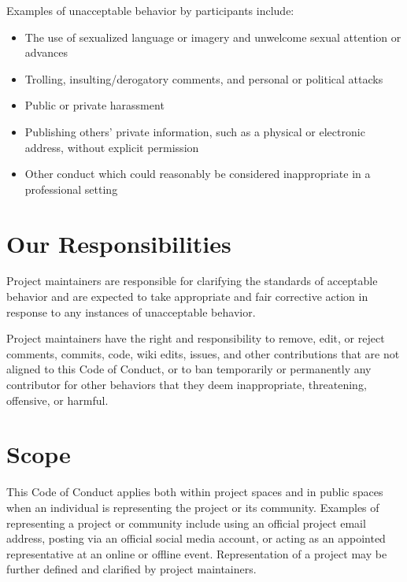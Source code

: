 \documentclass[letterpaper,10pt,english]{sphinxmanual}
\begin{document}
\sphinxAtStartPar
Examples of unacceptable behavior by participants include:
\begin{itemize}
\item {} 
\sphinxAtStartPar
The use of sexualized language or imagery and unwelcome sexual attention or advances

\item {} 
\sphinxAtStartPar
Trolling, insulting/derogatory comments, and personal or political attacks

\item {} 
\sphinxAtStartPar
Public or private harassment

\item {} 
\sphinxAtStartPar
Publishing others’ private information, such as a physical or electronic address, without explicit permission

\item {} 
\sphinxAtStartPar
Other conduct which could reasonably be considered inappropriate in a professional setting

\end{itemize}


\section{Our Responsibilities}
\label{\detokenize{contribute/codeconduct:our-responsibilities}}
\sphinxAtStartPar
Project maintainers are responsible for clarifying the standards of acceptable behavior and are expected to take appropriate and fair corrective action in response to any instances of unacceptable behavior.

\sphinxAtStartPar
Project maintainers have the right and responsibility to remove, edit, or reject comments, commits, code, wiki edits, issues, and other contributions that are not aligned to this Code of Conduct, or to ban temporarily or permanently any contributor for other behaviors that they deem inappropriate, threatening, offensive, or harmful.


\section{Scope}
\label{\detokenize{contribute/codeconduct:scope}}
\sphinxAtStartPar
This Code of Conduct applies both within project spaces and in public spaces when an individual is representing the project or its community. Examples of representing a project or community include using an official project e\sphinxhyphen{}mail address, posting via an official social media account, or acting as an appointed representative at an online or offline event. Representation of a project may be further defined and clarified by project maintainers.
\end{document}
